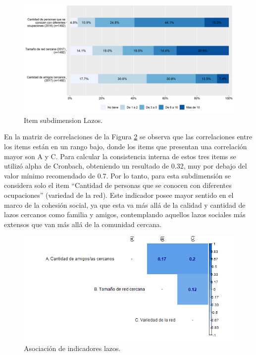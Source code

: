 \documentclass[
  12pt,
]{book}
\begin{document}
\begin{figure}[H]

{\centering \includegraphics[width=1\linewidth,height=1\textheight]{output/graphs/lazos} 

}

\caption{Item subdimension Lazos.}\label{fig:lazos}
\end{figure}

En la matriz de correlaciones de la Figura \ref{fig:lazos-cor} se observa que las correlaciones entre los items están en un rango bajo, donde los items que presentan una correlación mayor son A y C. Para calcular la consistencia interna de estos tres items se utilizó alpha de Cronbach, obteniendo un resultado de 0.32, muy por debajo del valor mínimo recomendado de 0.7. Por lo tanto, para esta subdimensión se considera solo el item ``Cantidad de personas que se conocen con diferentes ocupaciones'' (variedad de la red). Este indicador posee mayor sentido en el marco de la cohesión social, ya que esta va más allá de la calidad y cantidad de lazos cercanos como familia y amigos, contemplando aquellos lazos sociales más extensos que van más allá de la comunidad cercana.

\begin{figure}[H]

{\centering \includegraphics[width=1\linewidth,height=1\textheight]{output/graphs/lazos_cor} 

}

\caption{Asociación de indicadores lazos.}\label{fig:lazos-cor}
\end{figure}
\end{document}
